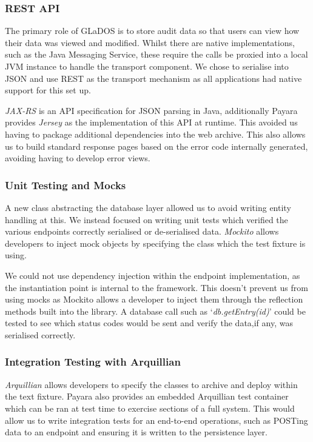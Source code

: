 \subsubsection{REST API}
\par
The primary role of GLaDOS is to store audit data so that users can view how their data was viewed and modified. Whilst there are native implementations, such as the Java Messaging Service, these require the calls be proxied into a local JVM instance to handle the transport component. We chose to serialise into JSON and use REST as the transport mechanism as all applications had native support for this set up.

\par
\textit{JAX-RS} is an API specification for JSON parsing in Java, additionally Payara provides \textit{Jersey} as the implementation of this API at runtime. This avoided us having to package additional dependencies into the web archive. This also allows us to build standard response pages based on the error code internally generated, avoiding having to develop error views.        

\subsubsection{Unit Testing and Mocks}
\par
A new class abstracting the database layer allowed us to avoid writing entity handling at this. We instead focused on writing unit tests which verified the various endpoints correctly serialised or de-serialised data. \textit{Mockito}\cite{Mockito} allows developers to inject mock objects by specifying the class which the test fixture is using.

\par
We could not use dependency injection within the endpoint implementation, as the instantiation point is internal to the framework. This doesn't prevent us from using mocks as Mockito allows a developer to inject them through the reflection methods built into the library. A database call such as `\textit{db.getEntry(id)}' could be tested to see which status codes would be sent and verify the data,if any, was serialised correctly.

\subsubsection{Integration Testing with Arquillian}
\textit{Arquillian}\cite{Arquillian} allows developers to specify the classes to archive and deploy within the text fixture. Payara also provides an embedded Arquillian test container which can be ran at test time to exercise sections of a full system. This would allow us to write integration tests for an end-to-end operations, such as POSTing data to an endpoint and ensuring it is written to the persistence layer.

